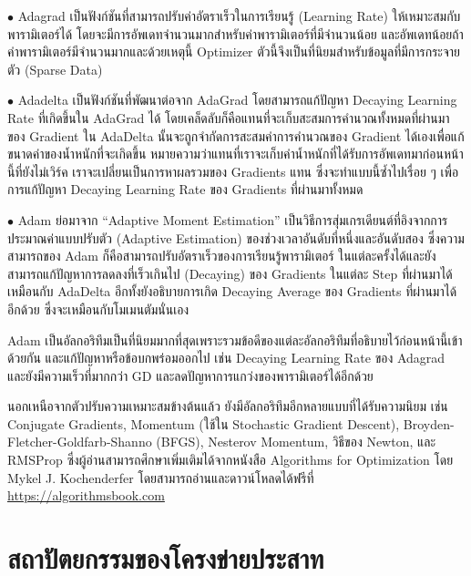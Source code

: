\noindent $\bullet$ Adagrad เป็นฟังก์ชันที่สามารถปรับค่าอัตราเร็วในการเรียนรู้ (Learning Rate) ให้เหมาะสมกับพารามิเตอร์ได้ 
โดยจะมีการอัพเดทจำนวนมากสำหรับค่าพารามิเตอร์ที่มีจำนวนน้อย และอัพเดทน้อยถ้าค่าพารามิเตอร์มีจำนวนมากและด้วยเหตุนี้ Optimizer 
ตัวนี้จึงเป็นที่นิยมสำหรับข้อมูลที่มีการกระจายตัว (Sparse Data)

\noindent $\bullet$ Adadelta เป็นฟังก์ชันที่พัฒนาต่อจาก AdaGrad โดยสามารถแก้ปัญหา Decaying Learning Rate ที่เกิดขึ้นใน 
AdaGrad ได้ โดยเคล็ดลับก็คือแทนที่จะเก็บสะสมการคำนวณทั้งหมดที่ผ่านมาของ Gradient ใน AdaDelta นั้นจะถูกจำกัดการสะสมค่าการคำนวณของ 
Gradient ได้เองเพื่อแก้ขนาดค่าของน้ำหนักที่จะเกิดขึ้น หมายความว่าแทนที่เราจะเก็บค่าน้ำหนักที่ได้รับการอัพเดทมาก่อนหน้านี้ที่ยังไม่เวิร์ค 
เราจะเปลี่ยนเป็นการหาผลรวมของ Gradients แทน ซึ่งจะทำแบบนี้ซ้ำไปเรื่อย ๆ เพื่อการแก้ปัญหา Decaying Learning Rate ของ Gradients 
ที่ผ่านมาทั้งหมด

\noindent $\bullet$ Adam ย่อมาจาก \enquote{Adaptive Moment Estimation} เป็นวิธีการสุ่มเกรเดียนต์ที่อิงจากการประมาณค่าแบบปรับตัว 
(Adaptive Estimation) ของช่วงเวลาอันดับที่หนึ่งและอันดับสอง ซึ่งความสามารถของ Adam ก็คือสามารถปรับอัตราเร็วของการเรียนรู้พารามิเตอร์%
ในแต่ละครั้งได้และยังสามารถแก้ปัญหาการลดลงที่เร็วเกินไป (Decaying) ของ Gradients ในแต่ละ Step ที่ผ่านมาได้เหมือนกับ AdaDelta 
อีกทั้งยังอธิบายการเกิด Decaying Average ของ Gradients ที่ผ่านมาได้อีกด้วย ซึ่งจะเหมือนกับโมเมนตัมนั่นเอง

Adam เป็นอัลกอริทึมเป็นที่นิยมมากที่สุดเพราะรวมข้อดีของแต่ละอัลกอริทึมที่อธิบายไว้ก่อนหน้านี้เข้าด้วยกัน และแก้ปัญหาหรือข้อบกพร่อมออกไป 
เช่น Decaying Learning Rate ของ Adagrad และยังมีความเร็วที่มากกว่า GD และลดปัญหาการแกว่งของพารามิเตอร์ได้อีกด้วย

นอกเหนือจากตัวปรับความเหมาะสมข้างต้นแล้ว ยังมีอัลกอริทึมอีกหลายแบบที่ได้รับความนิยม เช่น Conjugate Gradients, Momentum (ใช้ใน
Stochastic Gradient Descent), Broyden-Fletcher-Goldfarb-Shanno (BFGS), Nesterov Momentum, วิธีของ Newton, และ
RMSProp ซึ่งผู้อ่านสามารถศึกษาเพิ่มเติมได้จากหนังสือ Algorithms for Optimization\autocite{kochenderfer2019} โดย Mykel J. 
Kochenderfer โดยสามารถอ่านและดาวน์โหลดได้ฟรีที่ \url{https://algorithmsbook.com}

\section{สถาปัตยกรรมของโครงข่ายประสาท}
\label{sec:arch_nn}

